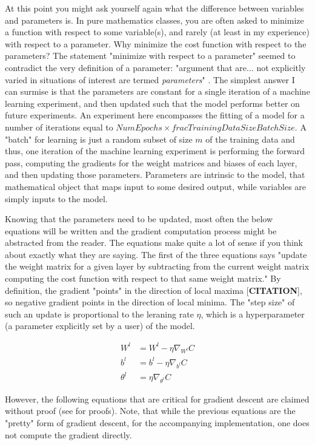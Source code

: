 \documentclass{article}
\begin{document}
At this point you might ask yourself again what the difference between
variables and parameters is. In pure mathematics classes, you are often asked
to minimize a function with respect to some variable(s), and rarely (at least in
my experience) with respect to a parameter. Why minimize the cost
function with respect to the parameters? The statement "minimize with respect
to a parameter" seemed to contradict the very definition of a parameter:
"argument that are... not explicitly varied in situations of interest are termed
\textit{parameters}" \cite{WolframMathWorldParameterDefinition}. The simplest
answer I can surmise is that the parameters are constant for a single iteration
of a machine learning experiment, and then updated such that the model performs
better on future experiments. An experiment here encompasses the fitting of a
model for a number of iterations equal to
$NumEpochs \times frac{TrainingDataSize}{BatchSize}$. A "batch" for learning
is just a random subset of size $m$ of the training data and thus, one iteration of the
machine learning experiment is performing the forward pass, computing the gradients
for the weight matrices and biases of each layer, and then updating those
parameters. Parameters are intrinsic to the model, that mathematical object
that maps input to some desired output, while variables are simply inputs
to the model.

Knowing that the parameters need to be updated, most often the below equations
will be written and the gradient computation process might be abstracted from
the reader. The equations make quite a lot of sense if you think about exactly
what they are saying. The first of the three equations says "update the
weight matrix for a given layer by subtracting from the current weight matrix
computing the cost function with respect to that same weight matrix." By definition,
the gradient "points" in the direction of local maxima [\textbf{CITATION}], so
negative gradient points in the direction of local minima. The "step size" of
such an update is proportional to the leraning rate $\eta$, which is a
hyperparameter (a parameter explicitly set by a user) of the model.

\begin{align}
	W^{l}      & = W^{l} - \eta \nabla_{W^{l}}C \\
	b^{l}      & = b^{l} - \eta \nabla_{b^{l}}C \\
	\theta^{l} & = \eta \nabla_{\theta^{l}}C
\end{align}

However, the following equations that are critical for gradient descent
are claimed without proof (see \cite{Nielsen2015} for proofs). Note, that while
the previous equations are the "pretty" form of gradient descent, for the
accompanying implementation, one does not compute the gradient directly.
\end{document}
